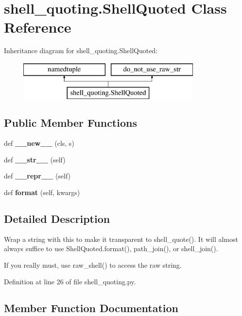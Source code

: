 \section{shell\+\_\+quoting.\+Shell\+Quoted Class Reference}
\label{classshell__quoting_1_1ShellQuoted}
Inheritance diagram for shell\+\_\+quoting.\+Shell\+Quoted\+:\begin{figure}[H]
\begin{center}
\leavevmode
\includegraphics[height=2.000000cm]{classshell__quoting_1_1ShellQuoted}
\end{center}
\end{figure}
\subsection*{Public Member Functions}
\begin{DoxyCompactItemize}
\item 
def {\bf \+\_\+\+\_\+new\+\_\+\+\_\+} (cls, s)
\item 
def {\bf \+\_\+\+\_\+str\+\_\+\+\_\+} (self)
\item 
def {\bf \+\_\+\+\_\+repr\+\_\+\+\_\+} (self)
\item 
def {\bf format} (self, kwargs)
\end{DoxyCompactItemize}


\subsection{Detailed Description}
\begin{DoxyVerb}Wrap a string with this to make it transparent to shell_quote().  It
will almost always suffice to use ShellQuoted.format(), path_join(),
or shell_join().

If you really must, use raw_shell() to access the raw string.\end{DoxyVerb}
 

Definition at line 26 of file shell\+\_\+quoting.\+py.



\subsection{Member Function Documentation}
